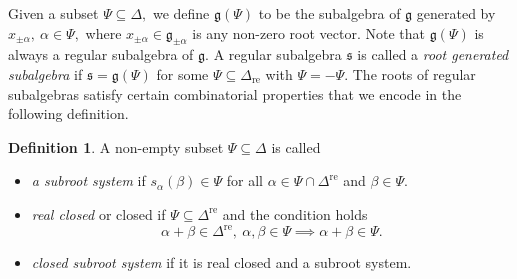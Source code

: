 \documentclass[12pt,reqno]{amsart}
\theoremstyle{plain}
\theoremstyle{definition}
\newtheorem{defn}{Definition}
\theoremstyle{remark}
\newcommand{\lie}[1]{\mathfrak{#1}}
\begin{document}
Given a subset $\Psi\subseteq\Delta,$ we define $\lie g(\Psi)$ to be the subalgebra of $\lie g$ generated by $x_{\pm\alpha},\ \alpha\in\Psi,$ where $x_{\pm\alpha}\in\lie g_{\pm\alpha}$ is any non-zero root vector. Note that $\lie g(\Psi)$ is always a regular subalgebra of $\lie g.$ A regular subalgebra $\lie s$ is called a \textit{root generated subalgebra} if $\lie s=\lie g(\Psi)$ for some $\Psi\subseteq \Delta_{\mathrm{re}}$ with $\Psi=-\Psi.$ The roots of regular subalgebras satisfy certain combinatorial properties that we encode in the following definition.


\begin{defn}\label{keydefn}
A non-empty subset $\Psi\subseteq \Delta$ is called 
\begin{itemize}

    
    \item \textit{ a subroot system} if $s_{\alpha}(\beta)\in \Psi$ for all $\alpha\in \Psi\cap \Delta^{\mathrm{re}}$ and $\beta\in \Psi$.
    
    \vspace{0,2cm}
    

       
    \item \textit{real closed} or closed if $\Psi\subseteq \Delta^{\mathrm{re}}$ and the condition holds
    $$\alpha+\beta\in \Delta^{\mathrm{re}},\ \alpha,\beta\in \Psi \implies \alpha+\beta\in \Psi.$$
    
    \item \textit{closed subroot system} if it is real closed and a subroot system.
\end{itemize}
\end{defn}
\end{document}
